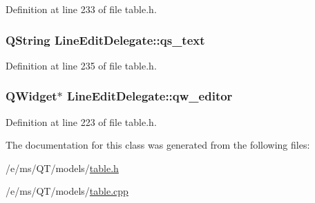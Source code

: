 Definition at line 233 of file table.h.

\hypertarget{classLineEditDelegate_ad734b27bd24f9eebab7dc0b0a70897a7}{
\subsubsection[{qs\_\-text}]{\setlength{\rightskip}{0pt plus 5cm}QString {\bf LineEditDelegate::qs\_\-text}}}
\label{classLineEditDelegate_ad734b27bd24f9eebab7dc0b0a70897a7}


Definition at line 235 of file table.h.

\hypertarget{classLineEditDelegate_a16d00d8e62e3c89978d07adcffa007c9}{
\subsubsection[{qw\_\-editor}]{\setlength{\rightskip}{0pt plus 5cm}QWidget$\ast$ {\bf LineEditDelegate::qw\_\-editor}}}
\label{classLineEditDelegate_a16d00d8e62e3c89978d07adcffa007c9}


Definition at line 223 of file table.h.



The documentation for this class was generated from the following files:\begin{DoxyCompactItemize}
\item 
/e/ms/QT/models/\hyperlink{table_8h}{table.h}\item 
/e/ms/QT/models/\hyperlink{table_8cpp}{table.cpp}\end{DoxyCompactItemize}
